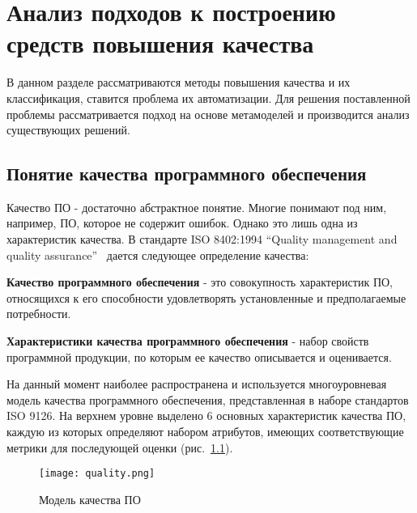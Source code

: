 \chapter{Анализ подходов к построению средств повышения качества}
\label{chap:analisys}

В данном разделе рассматриваются методы повышения качества и их классификация,
ставится проблема их автоматизации. Для решения поставленной проблемы
рассматривается подход на основе метамоделей и производится анализ существующих
решений.

\section{Понятие качества программного обеспечения}
\label{sec:quality}

Качество ПО - достаточно абстрактное понятие. Многие понимают под ним, например,
ПО, которое не содержит ошибок. Однако это лишь одна из характеристик качества.
В стандарте ISO 8402:1994 ``Quality management and quality
assurance''~\cite{international1994iso} дается следующее определение качества:

\textbf{Качество программного обеспечения} - это совокупность характеристик ПО,
относящихся к его способности удовлетворять установленные и предполагаемые
потребности.

\textbf{Характеристики качества программного обеспечения} - набор свойств
программной продукции, по которым ее качество описывается и оценивается.

На данный момент наиболее распространена и используется многоуровневая модель
качества программного обеспечения, представленная в наборе стандартов ISO 9126.
На верхнем уровне выделено 6 основных характеристик качества ПО, каждую из
которых определяют набором атрибутов, имеющих соответствующие метрики для
последующей оценки (рис.~\ref{fig:quality_model}).

\newpage
\begin{figure}[h]
    \begin{center}
        \texttt{[image: quality.png]}
    \end{center}
    \caption{Модель качества ПО}
    \label{fig:quality_model}
\end{figure}

